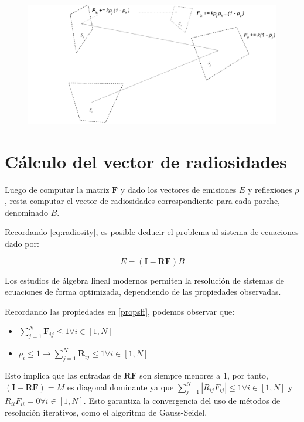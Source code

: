 \vspace{5mm}
\begin{figure}[H]
	\includegraphics[width=1\linewidth]{assets/extended}
	\label{img:caminoespecular}
\end{figure}

\section{Cálculo del vector de radiosidades}

Luego de computar la matriz $\mathbf{F}$ y dado los vectores de emisiones $E$ y reflexiones $\rho$, resta computar el vector de radiosidades correspondiente para cada parche, denominado $B$.

Recordando \eqref{eq:radiosity}, es posible deducir el problema al sistema de ecuaciones dado por:

\begin{equation}
	E = (\mathbf{I} - \mathbf{RF})B
\end{equation}

Los estudios de álgebra lineal modernos permiten la resolución de sistemas de ecuaciones de forma optimizada, dependiendo de las propiedades observadas.

Recordando las propiedades en \ref{propsff}, podemos observar que:

\begin{itemize}
	\item $\sum_{j=1}^{N} \mathbf{F}_{ij} \leq 1 \forall{i \in [1,N]}$
	\item $\rho_{i} \leq 1 \rightarrow \sum_{j=1}^{N} \mathbf{R}_{ij} \leq 1 \forall{i \in [1,N]}$
\end{itemize}

Esto implica que las entradas de $\mathbf{RF}$ s\texttt{}on siempre menores a $1$, por tanto, $(\mathbf{I} - \mathbf{RF}) = M$ es diagonal dominante ya que $\sum_{j=1}^{N}|R_{ij}F_{ij}| \le 1 \forall i \in [1, N]$ y $R_{ii}F_{ii} = 0  \forall  i \in [1,N]$. Esto garantiza la convergencia del uso de métodos de resolución iterativos, como el algoritmo de Gauss-Seidel.

